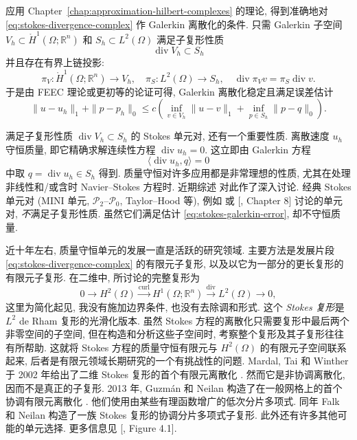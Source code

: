 {应用 Chapter~\ref{chap:approximation-hilbert-complexes} 的理论, 得到准确地对 \eqref{eq:stokes-divergence-complex} 作 Galerkin 离散化的条件. 只需 Galerkin 子空间 $V_h\subset\mathring H^1(\Omega;\mathbb R^n)$ 和 $S_h\subset L^2(\Omega)$ 满足子复形性质}
\begin{equation}\label{eq:stokes-discrete-subcomplex}
\operatorname{div}V_h\subset S_h
\end{equation}
{并且存在有界上链投影:}
\[
\pi_V:\mathring H^1(\Omega;\mathbb R^n)\to V_h,\quad\pi_S:L^2(\Omega)\to S_h,\quad\operatorname{div}\pi_Vv=\pi_S\operatorname{div}v.
\]
{于是由 FEEC 理论或更初等的论证可得, Galerkin 离散化稳定且满足误差估计}
\begin{equation}\label{eq:stokes-galerkin-error}
\|u-u_h\|_1+\|p-p_h\|_0\leq c\left(\inf_{v\in V_h}\|u-v\|_1+\inf_{p\in S_h}\|p-q\|_0\right).
\end{equation}

{满足子复形性质 $\operatorname{div}V_h\subset S_h$ 的 Stokes 单元对, 还有一个重要性质. 离散速度 $u_h$ 守恒质量, 即它精确求解连续性方程 $\operatorname{div}u_h=0$. 这立即由 Galerkin 方程}
\[
\langle\operatorname{div}u_h,q\rangle=0
\]
{中取 $q=\operatorname{div}u_h\in S_h$ 得到. 质量守恒对许多应用都是非常理想的性质, 尤其在处理非线性和/或含时 Navier–Stokes 方程时. 近期综述  对此作了深入讨论. 经典 Stokes 单元对 (MINI 单元, $\mathcal P_2$--$\mathcal P_0$, Taylor–Hood 等), 例如  或 [, Chapter 8] 讨论的单元对, \emph{不}满足子复形性质. 虽然它们满足估计 \eqref{eq:stokes-galerkin-error}, 却不守恒质量.}

{近十年左右, 质量守恒单元的发展一直是活跃的研究领域. 主要方法是发展片段 \eqref{eq:stokes-divergence-complex} 的有限元子复形, 以及以它为一部分的更长复形的有限元子复形. 在二维中, 所讨论的完整复形为}
\[
0\to H^2(\Omega)\xrightarrow{\operatorname{curl}}H^1(\Omega;\mathbb R^n)\xrightarrow{\operatorname{div}}L^2(\Omega)\to0,
\]
{这里为简化起见, 我没有施加边界条件, 也没有去除调和形式. 这个 \emph{Stokes 复形}是 $L^2$ de Rham 复形的光滑化版本. 虽然 Stokes 方程的离散化只需要复形中最后两个非零空间的子空间, 但在构造和分析这些子空间时, 考察整个复形及其子复形往往有所帮助. 这就将 Stokes 方程的质量守恒有限元与 $H^2(\Omega)$ 的有限元子空间联系起来, 后者是有限元领域长期研究的一个有挑战性的问题. Mardal, Tai 和 Winther 于 2002 年给出了二维 Stokes 复形的首个有限元离散化 . 然而它是非协调离散化, 因而不是真正的子复形. 2013 年, Guzmán 和 Neilan 构造了在一般网格上的首个协调有限元离散化 . 他们使用由某些有理函数增广的低次分片多项式. 同年 Falk 和 Neilan  构造了一族 Stokes 复形的协调分片多项式子复形. 此外还有许多其他可能的单元选择. 更多信息见 [, Figure 4.1].}


